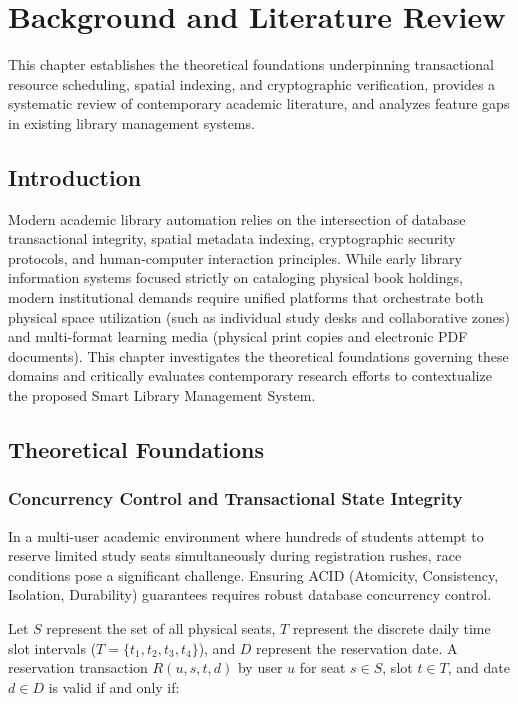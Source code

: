 \chapter{Background and Literature Review}

This chapter establishes the theoretical foundations underpinning transactional resource scheduling, spatial indexing, and cryptographic verification, provides a systematic review of contemporary academic literature, and analyzes feature gaps in existing library management systems.

\section{Introduction}
Modern academic library automation relies on the intersection of database transactional integrity, spatial metadata indexing, cryptographic security protocols, and human-computer interaction principles. While early library information systems focused strictly on cataloging physical book holdings, modern institutional demands require unified platforms that orchestrate both physical space utilization (such as individual study desks and collaborative zones) and multi-format learning media (physical print copies and electronic PDF documents). This chapter investigates the theoretical foundations governing these domains and critically evaluates contemporary research efforts to contextualize the proposed Smart Library Management System.

\section{Theoretical Foundations}

\subsection{Concurrency Control and Transactional State Integrity}
In a multi-user academic environment where hundreds of students attempt to reserve limited study seats simultaneously during registration rushes, race conditions pose a significant challenge. Ensuring ACID (Atomicity, Consistency, Isolation, Durability) guarantees requires robust database concurrency control.

Let $S$ represent the set of all physical seats, $T$ represent the discrete daily time slot intervals ($T = \{t_1, t_2, t_3, t_4\}$), and $D$ represent the reservation date. A reservation transaction $R(u, s, t, d)$ by user $u$ for seat $s \in S$, slot $t \in T$, and date $d \in D$ is valid if and only if:

